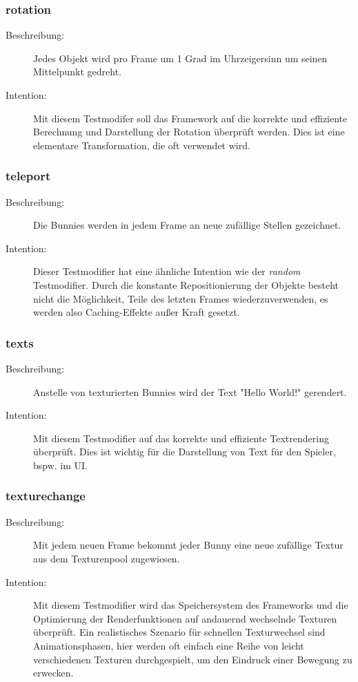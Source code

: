 \subsubsection{rotation}
\begin{description}
\item[Beschreibung:] Jedes Objekt wird pro Frame um 1 Grad im Uhrzeigersinn um seinen Mittelpunkt gedreht. \\
\item[Intention:] Mit diesem Testmodifer soll das Framework auf die korrekte und effiziente Berechnung und Darstellung der Rotation überprüft werden. Dies ist eine elementare Transformation, die oft verwendet wird.
\end{description}

\subsubsection{teleport}
\begin{description}
\item[Beschreibung:] Die Bunnies werden in jedem Frame an neue zufällige Stellen gezeichnet. \\
\item[Intention:] Dieser Testmodifier hat eine ähnliche Intention wie der \emph{random} Testmodifier. Durch die konstante Repositionierung der Objekte besteht nicht die Möglichkeit, Teile des letzten Frames wiederzuverwenden, es werden also Caching-Effekte außer Kraft gesetzt.
\end{description}

\subsubsection{texts}
\begin{description}
\item[Beschreibung:] Anstelle von texturierten Bunnies wird der Text "Hello World!" gerendert. \\
\item[Intention:] Mit diesem Testmodifier auf das korrekte und effiziente Textrendering überprüft. Dies ist wichtig für die Darstellung von Text für den Spieler, bspw. im UI.
\end{description}

\subsubsection{texturechange}
\begin{description}
\item[Beschreibung:] Mit jedem neuen Frame bekommt jeder Bunny eine neue zufällige Textur aus dem Texturenpool zugewiesen. \\
\item[Intention:] Mit diesem Testmodifier wird das Speichersystem des Frameworks und die Optimierung der Renderfunktionen auf andauernd wechselnde Texturen überprüft. Ein realistisches Szenario für schnellen Texturwechsel sind Animationsphasen, hier werden oft einfach eine Reihe von leicht verschiedenen Texturen durchgespielt, um den Eindruck einer Bewegung zu erwecken.
\end{description}

